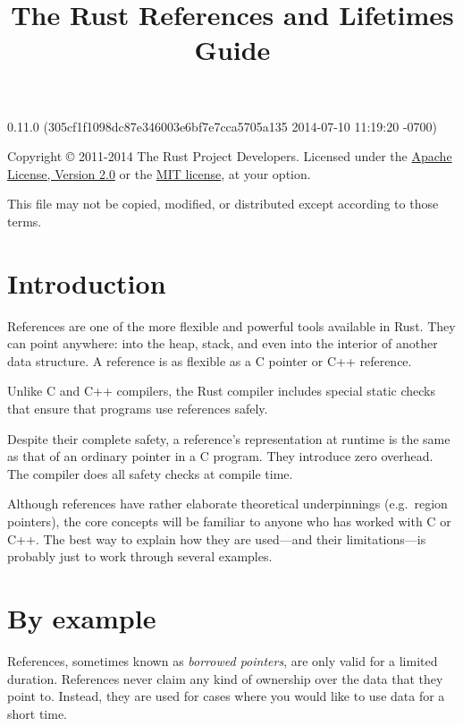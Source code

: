 \documentclass[]{article}
\title{The Rust References and Lifetimes Guide}
\begin{document}
\maketitle

0.11.0 (305cf1f1098dc87e346003e6bf7e7cca5705a135 2014-07-10 11:19:20 -0700)

Copyright © 2011-2014 The Rust Project Developers. Licensed under the
\href{http://www.apache.org/licenses/LICENSE-2.0}{Apache License,
Version 2.0} or the \href{http://opensource.org/licenses/MIT}{MIT
license}, at your option.

This file may not be copied, modified, or distributed except according
to those terms.

{
\hypersetup{linkcolor=black}
\setcounter{tocdepth}{3}
\tableofcontents
}
\section{Introduction}\label{introduction}

References are one of the more flexible and powerful tools available in
Rust. They can point anywhere: into the heap, stack, and even into the
interior of another data structure. A reference is as flexible as a C
pointer or C++ reference.

Unlike C and C++ compilers, the Rust compiler includes special static
checks that ensure that programs use references safely.

Despite their complete safety, a reference's representation at runtime
is the same as that of an ordinary pointer in a C program. They
introduce zero overhead. The compiler does all safety checks at compile
time.

Although references have rather elaborate theoretical underpinnings
(e.g.~region pointers), the core concepts will be familiar to anyone who
has worked with C or C++. The best way to explain how they are
used---and their limitations---is probably just to work through several
examples.

\section{By example}\label{by-example}

References, sometimes known as \emph{borrowed pointers}, are only valid
for a limited duration. References never claim any kind of ownership
over the data that they point to. Instead, they are used for cases where
you would like to use data for a short time.
\end{document}
